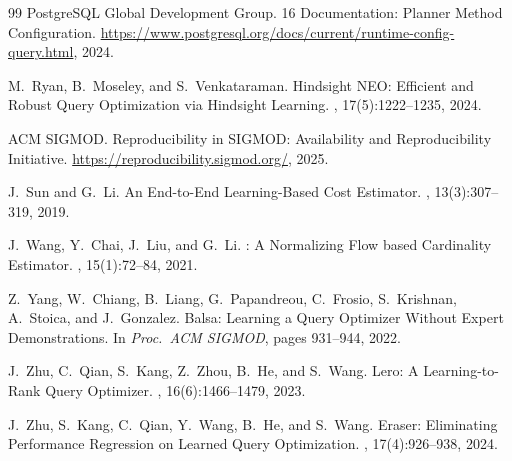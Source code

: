 \documentclass[sigconf,natbib=false]{article}
\begin{document}
\begin{thebibliography}{99}
{PostgreSQL Global Development Group}.
 16 Documentation: Planner Method Configuration.
\newblock \url{https://www.postgresql.org/docs/current/runtime-config-query.html},
  2024.

M.~Ryan, B.~Moseley, and S.~Venkataraman.
\newblock Hindsight {NEO}: Efficient and Robust Query Optimization via
  Hindsight Learning.
, 17(5):1222--1235, 2024.

{ACM SIGMOD}.
\newblock Reproducibility in {SIGMOD}: Availability and Reproducibility
  Initiative.
\newblock \url{https://reproducibility.sigmod.org/}, 2025.

J.~Sun and G.~Li.
\newblock An End-to-End Learning-Based Cost Estimator.
, 13(3):307--319, 2019.

J.~Wang, Y.~Chai, J.~Liu, and G.~Li.
: A Normalizing Flow based Cardinality Estimator.
, 15(1):72--84, 2021.

Z.~Yang, W.~Chiang, B.~Liang, G.~Papandreou, C.~Frosio, S.~Krishnan,
A.~Stoica, and J.~Gonzalez.
\newblock Balsa: Learning a Query Optimizer Without Expert Demonstrations.
\newblock In {\em Proc.\ ACM SIGMOD}, pages 931--944, 2022.

J.~Zhu, C.~Qian, S.~Kang, Z.~Zhou, B.~He, and S.~Wang.
\newblock Lero: A Learning-to-Rank Query Optimizer.
, 16(6):1466--1479, 2023.

J.~Zhu, S.~Kang, C.~Qian, Y.~Wang, B.~He, and S.~Wang.
\newblock Eraser: Eliminating Performance Regression on Learned Query
  Optimization.
, 17(4):926--938, 2024.

\end{thebibliography}
\end{document}
